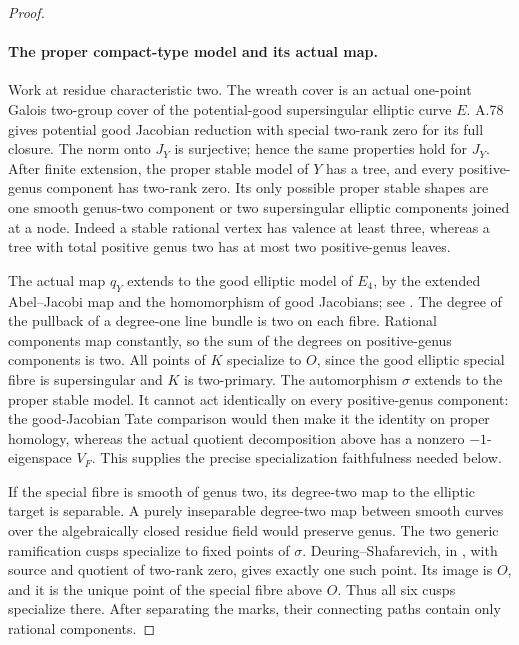\begin{proof}
\paragraph{The proper compact-type model and its actual map.}
Work at residue characteristic two. The wreath cover is an
actual one-point Galois two-group cover of the potential-good
supersingular elliptic curve \(E\). A.78 gives potential
good Jacobian reduction with special two-rank zero for its
full closure. The norm onto \(J_Y\) is surjective; hence
the same properties hold for \(J_Y\). After finite extension,
the proper stable model of \(Y\) has a tree, and every
positive-genus component has two-rank zero. Its only possible
proper stable shapes are one smooth genus-two component or
two supersingular elliptic components joined at a node.
Indeed a stable rational vertex has valence at least three,
whereas a tree with total positive genus two has at most two
positive-genus leaves.

The actual map \(q_Y\) extends to the good elliptic model
of \(E_4\), by the extended Abel--Jacobi map and the
homomorphism of good Jacobians; see
\cite[Theorem 1.1 and Proposition 3.2]{fghDupuyRabinoff}.
The degree of the pullback of a degree-one line bundle is
two on each fibre. Rational components map constantly, so
the sum of the degrees on positive-genus components is two.
All points of \(K\) specialize to \(O\), since the good
elliptic special fibre is supersingular and \(K\) is
two-primary. The automorphism \(\sigma\) extends to the
proper stable model. It cannot act identically on every
positive-genus component: the good-Jacobian Tate comparison
would then make it the identity on proper homology, whereas
the actual quotient decomposition above has a nonzero
\(-1\)-eigenspace \(V_F\). This supplies the precise
specialization faithfulness needed below.

If the special fibre is smooth of genus two, its degree-two
map to the elliptic target is separable. A purely inseparable
degree-two map between smooth curves over the algebraically
closed residue field would preserve genus. The two generic
ramification cusps specialize to fixed points of \(\sigma\).
Deuring--Shafarevich, in
\cite[Corollary 1.8, printed pp.35--36]{fghCrew1984},
with source and quotient of two-rank
zero, gives exactly one such point. Its image is \(O\),
and it is the unique point of the special fibre above \(O\).
Thus all six cusps specialize there. After separating the
marks, their connecting paths contain only rational components.


\end{proof}
